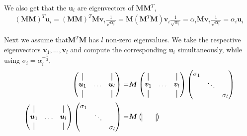     We also get that the $\bm{u}_i$ are eigenvectors of $\bm{MM}^T$, 
    \begin{align}
         (\bm{M}\bm{M})^T \bm{u}_i
        =(\bm{M}\bm{M})^T \bm{Mv}_i \frac{1}{\sqrt{\alpha_i}} 
        =\bm{M}(\bm{M}^T \bm{M}) \bm{v}_i \frac{1}{\sqrt{\alpha_i}} 
        = \alpha_i \bm{M} \bm{v}_i  \frac{1}{\sqrt{\alpha_i}} 
        = \alpha_i \bm{u}_i
    \end{align}
    
    Next we assume that$\bm{M}^T \bm{M}$ has $l$  non-zero eigenvalues.
    We take the respective eigenvectors $\bm{v}_1, \hdots, \bm{v}_l$  and compute the corresponding $\bm{u}_i$ 
    simultaneously, while using $\sigma_i=\alpha_i^{-\frac{1}{2}}$,
    \begin{align}
        \begin{pmatrix}
        \vertbar &        & \vertbar \\
        \bm{u}_1 & \hdots & \bm{u}_l \\
        \vertbar &        & \vertbar 
        \end{pmatrix} =&
        \bm{M}
        \begin{pmatrix}
        \vertbar &        & \vertbar \\
        \bm{v}_1 & \hdots & \bm{v}_l \\
        \vertbar &        & \vertbar 
        \end{pmatrix}
        \begin{pmatrix}
        \sigma_1 &        &          \\
                 & \ddots &          \\ 
                 &        & \sigma_l
        \end{pmatrix} \\
        \begin{pmatrix}
        \vertbar &        & \vertbar \\
        \bm{u}_1 & \hdots & \bm{u}_l \\
        \vertbar &        & \vertbar 
        \end{pmatrix}
        \begin{pmatrix}
            \sigma_1 &        &          \\
                     & \ddots &          \\ 
                     &        & \sigma_l
            \end{pmatrix}
        =&
        \bm{M}
        \begin{pmatrix}
        \vertbar &        & \vertbar \\

\end{pmatrix}
\end{align}
